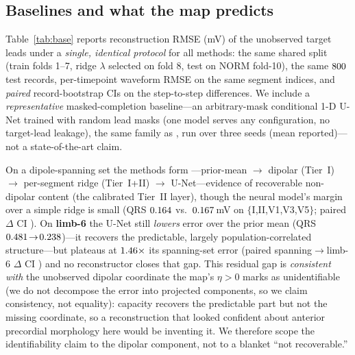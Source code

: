 \subsection{Baselines and what the map predicts}
Table~\ref{tab:base} reports reconstruction RMSE (mV) of the unobserved target leads under a
\emph{single, identical protocol} for all methods: the same shared split (train folds 1--7,
ridge $\lambda$ selected on fold 8, test on NORM fold-10), the same $\NTestFair$ test records,
per-timepoint waveform RMSE on the same segment indices, and \emph{paired} record-bootstrap
CIs on the step-to-step differences. We include a \emph{representative} masked-completion
baseline---an arbitrary-mask conditional 1-D U-Net trained with random lead masks (one model
serves any configuration, no target-lead leakage), the same family as
\cite{gradowski2025reveals,lence2025ecgrecover,fang2026imputeecg}, run over three seeds
(mean reported)---not a state-of-the-art claim.

On a dipole-spanning set the methods form \LadderQual{}---prior-mean $\to$ dipolar (Tier~I)
$\to$ per-segment ridge (Tier~I+II) $\to$ U-Net---evidence of recoverable non-dipolar content
(the calibrated Tier~II layer), though the neural model's margin over a simple ridge is small
(QRS $0.164$ vs.\ $0.167$\,mV on $\{$I,II,V1,V3,V5$\}$; paired
$\Delta$ CI \RidgeUnetSpanCI). On \textbf{limb-6} the U-Net still \emph{lowers} error over the
prior mean (QRS $0.481\!\to\!0.238$)---it recovers the predictable,
largely population-correlated structure---but plateaus at $1.46\times$ its
spanning-set error (paired spanning$\to$limb-6 $\Delta$ CI \SpanLimbUnetCI) and no reconstructor
closes that gap. This residual gap is \emph{consistent with} the unobserved dipolar coordinate
the map's $\eta{>}0$ marks as unidentifiable (we do not decompose the error into projected
components, so we claim consistency, not equality): capacity recovers the predictable part but
not the missing coordinate, so a reconstruction that looked confident about anterior precordial
morphology here would be inventing it. We therefore scope the identifiability claim to the
dipolar component, not to a blanket ``not recoverable.''

\begin{table}[t]
\centering\small
\caption{Reconstruction RMSE (mV) of target leads, QRS segment, under one identical
per-timepoint protocol on NORM fold-10 ($\NTestFair$ test records, shared split). ``dipolar''
= Tier~I; ``ridge'' = per-segment ridge (Tier~I+II); ``U-Net'' = representative masked-completion
baseline (3-seed mean). Best in bold. On limb-6 even the neural baseline plateaus far above its
identifiable-set error. Numbers auto-generated from \texttt{results/fair\_baselines.json}.}
\label{tab:base}

\end{table}

